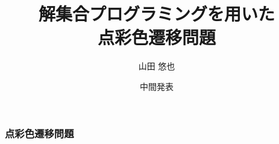 \documentclass[dvipdfmx,11pt]{beamer}
\title{解集合プログラミングを用いた\\点彩色遷移問題}
\author{山田 悠也}
\date{中間発表\\}
\institute{番原研究室}
\begin{document}
\begin{frame}\frametitle{}
  \titlepage
\end{frame}

\begin{frame}\frametitle{点彩色遷移問題}

\end{frame}











\end{document}
